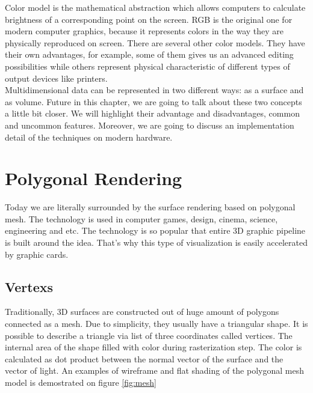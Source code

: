 \documentclass[twoside, english, 11pt]{report}
\begin{document}
Color model is the mathematical abstraction which allows computers to calculate brightness of a corresponding point on the screen. RGB is the original one for modern computer graphics, because it represents colors in the way they are physically reproduced on screen. There are several other color models. They have their own advantages, for example, some of them gives us an advanced editing possibilities while others represent physical characteristic of different types of output devices like printers.\\

Multidimensional data can be represented in two different ways: as a surface and as volume. Future in this chapter, we are going to talk about these two concepts a little bit closer. We will highlight their advantage and disadvantages, common and uncommon features. Moreover, we are going to discuss an implementation detail of the techniques on modern hardware.


\section{Polygonal Rendering}

Today we are literally surrounded by the surface rendering based on polygonal mesh. The technology is used in computer games, design, cinema, science, engineering and etc. The technology is so popular that entire 3D graphic pipeline is built around the idea. That's why this type of visualization is easily accelerated by graphic cards.\\

\subsection{Vertexs}
Traditionally, 3D surfaces are constructed out of huge amount of polygons connected as a mesh. Due to simplicity, they usually have a triangular shape. It is possible to describe a triangle via list of three coordinates called vertices. The internal area of the shape filled with color during rasterization step. The color is calculated as dot product between the normal vector of the surface and the vector of light. An examples of wireframe and flat shading of the polygonal mesh model is demostrated on figure \ref{fig:mesh}
\end{document}
